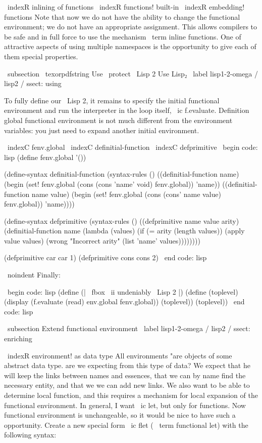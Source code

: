 \ indexR {inlining of functions}
\ indexR {functions! built-in}
\ indexR {embedding!} functions
Note that now we do not have the ability to change the functional environment;
we do not have an appropriate assignment. This allows compilers to be safe
and in full force to use the mechanism \ term {inline functions}. One of
attractive aspects of using multiple namespaces is
the opportunity to give each of them special properties.


\ subsection { \ texorpdfstring {Use \ protect \ Lisp 2} {Use Lisp₂}} %
\ label {lisp1-2-omega / lisp2 / ssect: using}

To fully define our \ Lisp 2, it remains to specify the initial functional
environment and run the interpreter in the loop itself, \ ic {f.evaluate}. Definition
global functional environment is not much different from the environment
variables: you just need to expand another initial environment.

\ indexC {fenv.global}
\ indexC {definitial-function}
\ indexC {defprimitive}
\ begin {code: lisp}
(define fenv.global '())

(define-syntax definitial-function
  (syntax-rules ()
    ((definitial-function name)
     (begin (set! fenv.global (cons (cons 'name' void) fenv.global))
            'name))
    ((definitial-function name value)
     (begin (set! fenv.global (cons (cons' name value) fenv.global))
            'name))))

(define-syntax defprimitive
  (syntax-rules ()
    ((defprimitive name value arity)
     (definitial-function name
       (lambda (values)
         (if (= arity (length values))
             (apply value values)
             (wrong "Incorrect arity"
              (list 'name' values))))))))

(defprimitive car car 1)
(defprimitive cons cons 2)
\ end {code: lisp}

\ noindent
Finally:

\ begin {code: lisp}
(define (| \ fbox { \ ii {undeniably \ Lisp 2}} |)
  (define (toplevel)
    (display (f.evaluate (read) env.global fenv.global))
    (toplevel))
  (toplevel))
\ end {code: lisp}


\ subsection {Extend functional environment} %
\ label {lisp1-2-omega / lisp2 / ssect: enriching}

\ indexR {environment! as data type}
All environments "are objects of some abstract data type.
are we expecting from this type of data? We expect that he will keep the links between
names and essences, that we can by name find the necessary entity, and that we
we can add new links. We also want to be able to determine local
function, and this requires a mechanism for local expansion of the functional
environment. In general, I want \ ic {let}, but only for functions. Now
functional environment is unchangeable, so it would be nice to have such a
opportunity. Create a new special form \ ic {flet} ( \ term {functional let})
with the following syntax:

